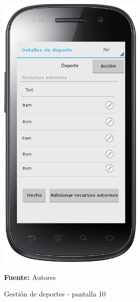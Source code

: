 \begin{figure}[!htb]
  \begin{center}
    \includegraphics[width=7cm]{./imagenes/UI/Deportes/gestion_deportes_10.png}
    \caption{Gestión de deportes - pantalla 10}
    \label{fig:gestion_deportes_}
    \textbf{Fuente:}  Autores
  \end{center}
\end{figure}

